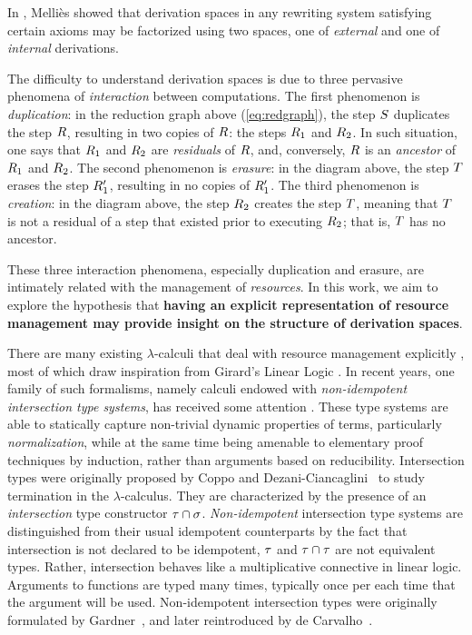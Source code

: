 In \cite{DBLP:conf/ctcs/Mellies97}, Melli\`es showed that
derivation spaces in any rewriting system satisfying certain axioms
may be factorized using two spaces,
one of {\em external} and one of {\em internal} derivations.



The difficulty to understand derivation spaces is due to three pervasive phenomena
of \emph{interaction} between computations.
The first phenomenon is \emph{duplication}:
in the reduction graph above (\ref{eq:redgraph}), the step $S$ duplicates the step $R$,
resulting in two copies of $R$: the steps $R_1$ and $R_2$.
In such situation, one says that $R_1$ and $R_2$ are \emph{residuals} of $R$,
and, conversely, $R$ is an \emph{ancestor} of $R_1$ and $R_2$.
The second phenomenon is \emph{erasure}:
in the diagram above, the step $T$ erases the step $R'_1$,
resulting in no copies of $R'_1$.
The third phenomenon is \emph{creation}:
in the diagram above, the step $R_2$ creates the step $T$,
meaning that $T$ is not a residual of a step that existed prior
to executing $R_2$; that is, $T$ has no ancestor.

These three interaction phenomena, especially duplication and erasure,
are intimately related with the management of \emph{resources}.
In this work, we aim to explore the hypothesis that {\bf having an explicit
representation of resource management may provide insight on
the structure of derivation spaces}.

There are many existing $\lambda$-calculi that deal with resource management explicitly
\cite{boudol1993lambda,ehrhard2003differential,kesner2007resource,kesner2009prismoid},
most of which draw inspiration from Girard's Linear Logic \cite{girard1987linear}.
In recent years, one family of such formalisms, namely calculi endowed with
{\em non-idempotent intersection type systems},
has received some attention
\cite{ehrhard2012collapsing,bernadet2013non,bucciarelli2014inhabitation,bucciarelli2017non,kesner2016reasoning,thesisvial,KRV18}.
These type systems are able to statically capture non-trivial
dynamic properties of terms, particularly {\em normalization},
while at the same time being amenable to elementary proof techniques by induction,
rather than arguments based on reducibility.
Intersection types were originally proposed by
Coppo and Dezani-Ciancaglini~\cite{DBLP:journals/aml/CoppoD78}
to study termination in the $\lambda$-calculus.
They are characterized by the presence of an {\em intersection} type constructor $\tau \cap \sigma$.
{\em Non-idempotent} intersection type systems are distinguished from their usual idempotent
counterparts by the fact that intersection
is not declared to be idempotent, \ie $\tau$ and $\tau \cap \tau$ are not equivalent types.
Rather, intersection behaves like a multiplicative connective in linear logic.
Arguments to functions are typed many times, typically once
per each time that the argument will be used.
Non-idempotent intersection types were originally formulated by
Gardner~\cite{gardner1994discovering},
and later reintroduced by de Carvalho~\cite{carvalho2007semantiques}.


